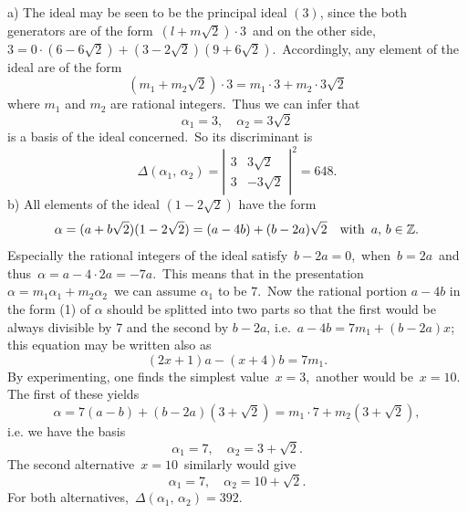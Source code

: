 \documentclass[12pt]{article}
\theoremstyle{definition}
\begin{document}
a) The ideal may be seen to be the principal ideal $(3)$, since the both generators are of the form\, $(l+m\sqrt{2})\cdot3$\, and on the other side,\, $3 = 0\cdot(6-6\sqrt{2})+(3-2\sqrt{2})(9+6\sqrt{2})$.\, Accordingly, any element of the ideal are of the form
$$(m_1+m_2\sqrt{2})\cdot3 = m_1\cdot3+m_2\cdot3\sqrt{2}$$
where $m_1$ and $m_2$ are rational integers.\, Thus we can infer that 
$$\alpha_1 = 3, \quad \alpha_2 = 3\sqrt{2}$$
is a basis of the ideal concerned.\, So its discriminant is
$$\Delta(\alpha_1,\,\alpha_2) = 
\left|\begin{matrix}
3 & 3\sqrt{2}\\
3 & -3\sqrt{2}
\end{matrix}\right|^2 = 648.$$
b) All elements of the ideal $(1-2\sqrt{2})$ have the form
\begin{align}
\alpha = (a+b\sqrt{2})(1-2\sqrt{2}) = (a-4b)+(b-2a)\sqrt{2} \quad 
\mbox{with\, } a,\,b \in\mathbb{Z}.
\end{align}
Especially the rational integers of the ideal satisfy\, $b-2a = 0$,\, when\, $b = 2a$\, and thus\, $\alpha = a-4\cdot2a = -7a$.\,  This means that in the presentation\, $\alpha = m_1\alpha_1+m_2\alpha_2$\, we can assume $\alpha_1$ to be $7$.\, Now the rational portion $a-4b$ in the form (1) of $\alpha$ should be splitted into two parts so that the first would be always divisible by 7 and the second by $b-2a$, i.e.\, $a-4b = 7m_1+(b-2a)x$; this equation may be written also as
$$(2x+1)a-(x+4)b = 7m_1.$$
By experimenting, one finds the simplest value\, $x = 3$,\, another would be\, $x = 10$.\, The first of these yields
$$\alpha = 7(a-b)+(b-2a)(3+\sqrt{2}) = m_1\cdot7+m_2(3+\sqrt{2}),$$
i.e. we have the basis
$$\alpha_1 = 7, \quad \alpha_2 = 3+\sqrt{2}.$$
The second alternative\, $x = 10$\, similarly would give
$$\alpha_1 = 7, \quad \alpha_2 = 10+\sqrt{2}.$$
For both alternatives,\, $\Delta(\alpha_1,\,\alpha_2) = 392$.




\end{document}
